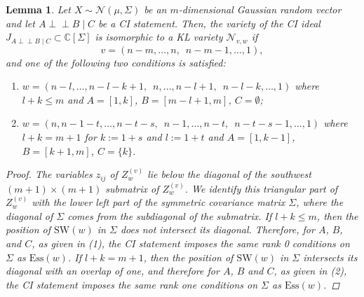 \documentclass[11pt]{amsart}
\newtheorem{lemma}[theorem]{Lemma}
\theoremstyle{definition}
\theoremstyle{definition}
\theoremstyle{definition}
\theoremstyle{definition}
\newcommand{\SW}{\mathrm{SW}}
\newcommand{\Ess}{\mathrm{Ess}}
\newcommand{\Nvw}{\mathcal{N}_{v,w}}
\newcommand{\Zg}{Z^{(v)}_w}
\newcommand{\indep}{\perp \!\!\! \perp}
\begin{document}
\begin{lemma}\label{KL CI}
    Let $X \sim \mathcal N (\mu, \Sigma)$ be an $m$-dimensional Gaussian random vector and let $A \indep B \mid C$ be a CI statement. Then, the variety of the CI ideal $J_{A \indep B \mid C} \subset \mathbb C [\Sigma]$ is isomorphic to a KL variety $\Nvw$ if
$$
v  = (n-m, \ldots, n, \,\,\, n-m-1, \ldots, 1),
$$
and one of the following two conditions is satisfied:

\begin{enumerate}
\item $w = (n-l, \ldots, n-l-k+1, \,\,\, n, \ldots, n-l+1, \,\,\, n-l-k, \ldots, 1)$
where $l+k \leq m $ and $A=[1,k]$, $B=[m-l+1,m]$, $C= \emptyset$;

\item $w= (n, n-1-t, \ldots, n-t-s , \,\,\, n-1, \ldots, n-t, \,\,\, n-t-s-1, \ldots, 1) $
where $l+k=m+1$ for $k:= 1+s$ and $l:= 1+t$ and 
$A=[1,k-1]$, $B=[k+1,m]$, $C=\{k\}$.
\end{enumerate}
\begin{proof}
The variables $z_{ij}$ of $\Zg$ lie below the diagonal of the southwest $(m+1) \times (m+1)$ submatrix of $\Zg$. We identify this triangular part of $\Zg$ with the lower left part of the symmetric covariance matrix $\Sigma$, where the diagonal of $\Sigma$ comes from the subdiagonal of the submatrix. If $l+k \leq m$, then the position of $\SW(w)$ in $\Sigma$ does not intersect its diagonal. Therefore, for $A$, $B$, and $C$, as given in (1), the CI statement imposes the same rank 0 conditions on $\Sigma$ as $\Ess(w)$. If $l+k = m+1$, then the position of $\SW(w)$ in $\Sigma$ intersects its diagonal with an overlap of one, and therefore for $A$, $B$ and $C$, as given in (2), the CI statement imposes the same rank one conditions on $\Sigma$ as $\Ess(w)$. 
\end{proof}

\begin{figure}[H]
\begin{minipage}[c]{0.33\textwidth}
\end{minipage}
\end{figure}
\end{lemma}
\end{document}
